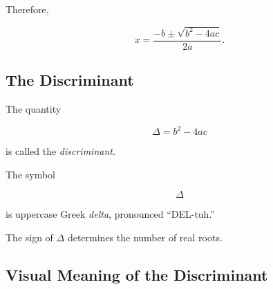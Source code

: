 Therefore,

\begin{importantbox}
\[ x=\frac{-b\pm\sqrt{b^2-4ac}}{2a}. \]
\end{importantbox}

\subsection{The Discriminant}
\label{subsec:discriminant}

The quantity

\[ \Delta=b^2-4ac \]

is called the \emph{discriminant}.

The symbol

\[ \Delta \]

is uppercase Greek \emph{delta}, pronounced ``DEL-tuh.''

The sign of \(\Delta\) determines the number of real roots.

\subsection{Visual Meaning of the Discriminant}
\label{subsec:visual-discriminant}

